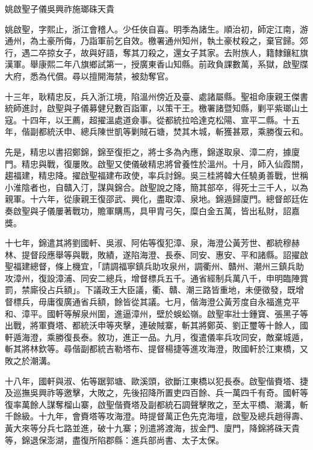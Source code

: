 
\begin{pinyinscope}
姚啟聖子儀吳興祚施瑯硃天貴

姚啟聖，字熙止，浙江會稽人。少任俠自喜。明季為諸生。順治初，師定江南，游通州，為土豪所侮，乃詣軍前乞自效。檄署通州知州，執土豪杖殺之，棄官歸。郊行，遇二卒掠女子，故與好語，奪其刀殺之，還女子其家。去附族人，籍隸鑲紅旗漢軍。舉康熙二年八旗鄉試第一，授廣東香山知縣。前政負課數萬，系獄，啟聖牒大府，悉為代償。尋以擅開海禁，被劾奪官。

十三年，耿精忠反，兵入浙江境，陷溫州傍近及臺、處諸屬縣。聖祖命康親王傑書統師進討，啟聖與子儀募健兒數百詣軍，以策干王。檄署諸暨知縣，剿平紫瑯山土寇。十四年，以王薦，超擢溫處道僉事。從都統拉哈達克松陽、宣平二縣。十五年，偕副都統沃申、總兵陳世凱等剿賊石塘，焚其木城，斬獲甚眾，乘勝復云和。

先是，精忠以書招鄭錦，錦至復拒之，將士多為內應，錦遂取泉、漳二府，據廈門。精忠與戰，復屢敗。啟聖又使儀破精忠將曾養性於溫州。十月，師入仙霞關，趨福建，精忠降。擢啟聖福建布政使，率兵討錦。吳三桂將韓大任驍勇善戰，世稱小淮陰者也，自贛入汀，謀與錦合。啟聖說之降，簡其部卒，得死士三千人，以為親軍。十六年，從康親王復邵武、興化，盡取漳、泉地。錦遁歸廈門。總督郎廷佐奏啟聖與子儀屢著戰功，贍軍購馬，具甲胄弓矢，糜白金五萬，皆出私財，詔嘉獎。

十七年，錦遣其將劉國軒、吳淑、阿佑等復犯漳、泉，海澄公黃芳世、都統穆赫林、提督段應舉等與戰，敗績，遂陷海澄、長泰、同安、惠安、平和諸縣。詔擢啟聖福建總督，條上機宜，「請調福寧鎮兵助攻泉州，調衢州、贛州、潮州三鎮兵助攻漳州，復設漳浦、同安二總兵，增督標兵五千。通省經制兵萬八千，申明臨陣賞罰，禁廝役占兵額」。下議政王大臣議，衢、贛、潮三路皆重地，未便徵發，既增督標兵，毋庸復廣通省兵額，餘皆從其議。七月，偕海澄公黃芳度自永福進克平和、漳平。國軒等解泉州圍，進逼漳州，壁於蜈蚣嶺。啟聖率壯士鍾寶、張黑子等出戰，將軍賚塔、都統沃申等夾擊，連破賊寨，斬其將鄭英、劉正璽等十餘人，國軒遁海澄，乘勝復長泰。敘功，進正一品。九月，復遣儀率兵攻同安，敵棄城遁，斬其將林欽等。尋偕副都統吉勒塔布、提督楊捷等進攻海澄，敗國軒於江東橋，又敗之於潮溝。

十八年，國軒與淑、佑等踞郭塘、歐溪頭，欲斷江東橋以犯長泰。啟聖偕賚塔、捷及巡撫吳興祚等邀擊，大敗之，先後招降所置吏四百餘、兵一萬四千有奇。國軒等復率萬餘人謀奪榴山寨，啟聖偕賚塔及副都統石調聲擊敗之，至太平橋、潮溝，斬千餘級。十九年，會賚塔等攻海澄。時提督萬正色先克海壇，啟聖及總兵趙得壽、黃大來等分兵七路並進，破十九寨；別遣將渡海，拔金門、廈門，降錦將硃天貴等，錦退保澎湖，盡復所陷郡縣：進兵部尚書、太子太保。


\end{pinyinscope}
